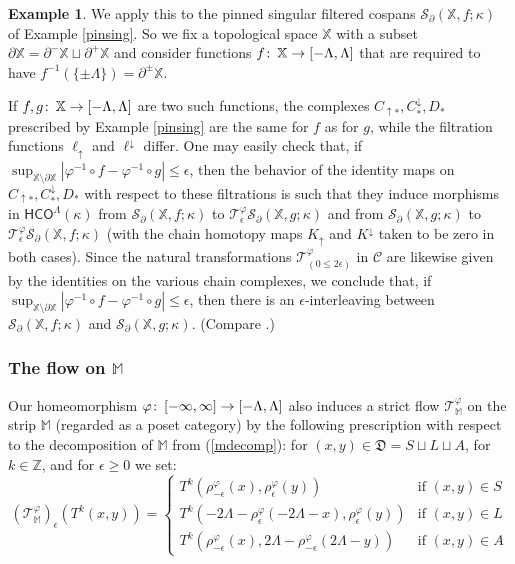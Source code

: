 \documentclass[11pt]{amsart}
\theoremstyle{definition}
\newtheorem{ex}[theorem]{Example}
\theoremstyle{remark}
\numberwithin{equation}{section}
\def\co{\colon\thinspace}
\def\ep{\epsilon}
\def\Z{\mathbb{Z}}
\begin{document}
\begin{ex} \label{function-interleave}
 We apply this to the pinned singular filtered cospans $\mathcal{S}_{\partial}(\mathbb{X},f;\kappa)$ of Example \ref{pinsing}.  So we fix a topological space $\mathbb{X}$ with a subset $\partial\mathbb{X}=\partial^-\mathbb{X}\sqcup \partial^+\mathbb{X}$ and consider functions $f\co \mathbb{X}\to [-\Lambda,\Lambda]$ that are required to have $f^{-1}(\{\pm\Lambda\})=\partial^{\pm}\mathbb{X}$.
 
 If $f,g\co\mathbb{X}\to [-\Lambda,\Lambda]$ are two such functions, the complexes $C_{\uparrow *},C^{\downarrow}_{*},D_*$ prescribed by Example \ref{pinsing} are the same for $f$ as for $g$, while the filtration functions $\ell_{\uparrow}$ and $\ell^{\downarrow}$ differ.  One may easily check that, if  $\sup_{\mathbb{X}\setminus\partial\mathbb{X}}|\varphi^{-1}\circ f-\varphi^{-1}\circ g|\leq \ep$, then the behavior of the identity maps on $C_{\uparrow *},C^{\downarrow}_{*},D_*$ with respect to these filtrations is such that they induce morphisms in $\mathsf{HCO}^{\Lambda}(\kappa)$ from $\mathcal{S}_{\partial}(\mathbb{X},f;\kappa)$ to 
 $\mathcal{T}_{\ep}^{\varphi}\mathcal{S}_{\partial}(\mathbb{X},g;\kappa)$ and from $\mathcal{S}_{\partial}(\mathbb{X},g;\kappa)$ to 
 $\mathcal{T}_{\ep}^{\varphi}\mathcal{S}_{\partial}(\mathbb{X},f;\kappa)$  (with the chain homotopy maps $K_{\uparrow}$ and $K^{\downarrow}$ taken to be zero in both cases).  
 Since the natural transformations $\mathcal{T}^{\varphi}_{(0\leq 2\ep)}$ in $\mathcal{C}$ are likewise given by the identities on the various chain complexes, we conclude that, if   $\sup_{\mathbb{X}\setminus\partial\mathbb{X}}|\varphi^{-1}\circ f-\varphi^{-1}\circ g|\leq \ep$, then there is an $\ep$-interleaving between $\mathcal{S}_{\partial}(\mathbb{X},f;\kappa)$ and $\mathcal{S}_{\partial}(\mathbb{X},g;\kappa)$. (Compare \cite[Theorem 4.4]{BBF21}.)
\end{ex}

\subsubsection{The flow on $\mathbb{M}$}\label{mflowsect}

Our homeomorphism $\varphi\co [-\infty,\infty]\to[-\Lambda,\Lambda]$ also induces a strict flow $\mathcal{T}_{\mathbb{M}}^{\varphi}$ on the strip $\mathbb{M}$ (regarded as a poset category) by the following prescription with respect to the decomposition of $\mathbb{M}$ from (\ref{mdecomp}): for $(x,y)\in\mathfrak{D}=S\sqcup L\sqcup A$, for $k\in \Z$, and for $\ep\geq 0$ we set: \begin{equation}\label{mflow} (\mathcal{T}_{\mathbb{M}}^{\varphi})_{\ep}\left(T^k(x,y)\right)=\left\{\begin{array}{ll} T^k\left(\rho^{\varphi}_{-\ep}(x),\rho^{\varphi}_{\ep}(y)\right) & \mbox{if }(x,y)\in S \\ T^k\left(-2\Lambda-\rho^{\varphi}_{\ep}(-2\Lambda-x), \rho^{\varphi}_{\ep}(y)\right) & \mbox{if }(x,y)\in L\\ T^k\left(\rho^{\varphi}_{-\ep}(x),2\Lambda-\rho^{\varphi}_{-\ep}(2\Lambda-y)\right) & \mbox{if }(x,y)\in A    \end{array}\right.\end{equation}
\end{document}
